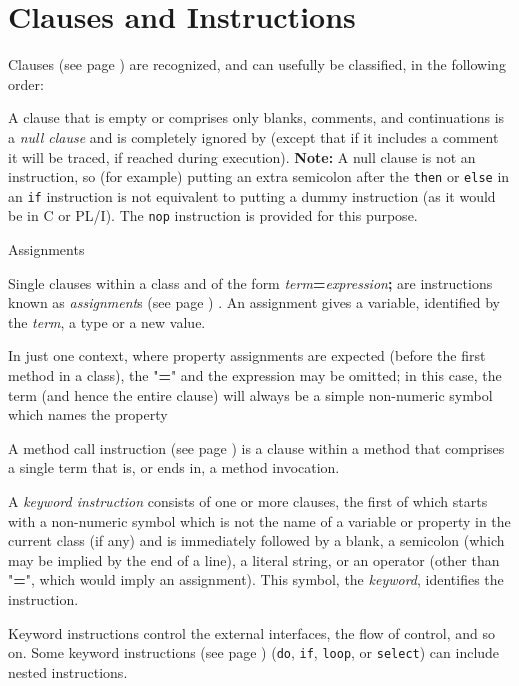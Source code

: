 \chapter{Clauses and Instructions}\label{refclause}
  Clauses (see page \pageref{refclau})  are recognized, and can usefully be
classified, in the following order:
\begin{description}
\item[Null clauses]\label{refnullcl}

A clause that is empty or comprises only blanks, comments, and
continuations is a \emph{null clause} and is completely ignored by
\nr{} (except that if it includes a comment it will be traced, if
reached during execution).
\textbf{Note: }A null clause is not an instruction, so (for example) putting an
extra semicolon after the \texttt{then} or \texttt{else} in an
\texttt{if} instruction is not equivalent to putting a dummy instruction
(as it would be in C or PL/I).
The \texttt{nop} instruction is provided for this purpose.
\item{Assignments}

Single clauses within a class and of the form
\emph{term}\textbf{=}\emph{expression}\textbf{;} are
instructions known as  \emph{assignment}s (see page \pageref{refassign}) .
An assignment gives a variable, identified by the
\emph{term}, a type or a new value.
 
In just one context, where property assignments are expected (before the
first method in a class), the "\textbf{=}" and the expression may
be omitted; in this case, the term (and hence the entire clause) will
always be a simple non-numeric symbol which names the property
\item[Method call instructions]\label{refxmeth}

A  method call instruction (see page \pageref{refmcalli})  is a clause within a
method that comprises a single term that is, or ends in, a method
invocation.
\item[Keyword instructions]\label{refkwcl}

A \emph{keyword instruction} consists of one or more clauses,
the first of which starts with a non-numeric symbol which is not the
name of a variable or property in the current class (if any) and is
immediately followed by a blank, a semicolon (which may be implied by
the end of a line), a literal string, or an operator (other than
"\textbf{=}", which would imply an assignment).
This symbol, the \emph{keyword}, identifies the instruction.
 
Keyword instructions control the external interfaces, the flow of
control, and so on.
Some  keyword instructions (see page \pageref{refkinst})  (\texttt{do}, \texttt{if},
\texttt{loop}, or \texttt{select}) can include nested instructions.
\end{description}
